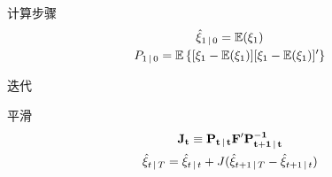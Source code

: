 \documentclass[11pt]{article}
\begin{document}
计算步骤
\begin{gather*}
    \hat{\xi}_{1\,\vert\, 0} = \mathbb{E}(\xi_1) \\
    P_{1\,\vert\, 0} = \mathbb{E} \left\{[\xi_1 - \mathbb{E}(\xi_1)][\xi_1 - \mathbb{E}(\xi_1)]'\right\}
\end{gather*}

迭代

平滑
\begin{gather*}
    \mathbf{J_t} \equiv \mathbf{P_{t\,\vert\, t}F'P^{-1}_{t+1\,\vert\, t}} \\
    \hat{\mathbf{\xi}}_{t \,\vert\, T} = \hat{\mathbf{\xi}}_{t \,\vert\, t} + J(\hat{\xi}_{t+1 \,\vert\, T} - \hat{\xi}_{t+1 \,\vert\, t})
\end{gather*}

\appendix
\end{document}
